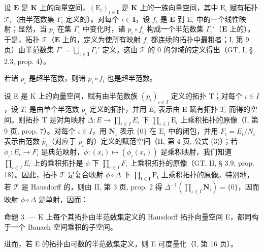 设 \(\mathbf{E}\) 是 \(\mathbf{K}\) 上的向量空间，\((\mathrm{E}_{\iota})_{\iota \in \mathbf{I}}\) 是 \(\mathbf{K}\) 上的一族向量空间，其中 \(\mathrm{E}_{\iota}\) 赋有拓扑 \(\mathcal{T}_{\iota}\)（由半范数集 \(\Gamma_{\iota}\) 定义的）。对每个 \(\iota \in \mathbf{I}\)，设 \(f_{\iota}\) 是 \(\mathbf{E}\) 到 \(\mathrm{E}_{\iota}\) 中的一个线性映射；显然，当 \(p_{\iota}\) 在集 \(\Gamma_{\iota}\) 中变化时，诸 \(p_{\iota} \circ f_{\iota}\) 构成一个半范数集 \(\Gamma_{\iota}'\)（\(\mathbf{E}\) 上的）。于是，拓扑 \(\mathcal{T}\)（\(\mathbf{E}\) 上的，定义为使所有映射 \(f_{\iota}\) 都连续的拓扑中最粗者；I, 第 9 页）由半范数集 \(\Gamma' = \bigcup_{\iota \in \mathbf{I}} \Gamma_{\iota}'\) 定义，这由 \(\mathcal{T}\) 的 0 的邻域的定义得出（GT, I, § 2.3, prop. 4）。

若诸 \(p_{\iota}\) 是超半范数，则诸 \(p_{\iota} \circ f_{\iota}\) 也是超半范数。

设 E 是 K 上的向量空间，赋有由半范数族 \((p_{\iota})_{\iota \in I}\) 定义的拓扑 T；对每个 \(\iota \in I\)，设 \(T_{\iota}\) 是由单个半范数 \(p_{\iota}\) 定义的拓扑，并用 \(E_{\iota}\) 表示由 E 赋有拓扑 \(T_{\iota}\) 而得的空间。则拓扑 T 是对角映射 \(\Delta : E \to \prod_{\iota \in I} E_{\iota}\) 下 \(\prod_{\iota \in I} \mathrm{E}_{\iota}\) 上乘积拓扑的原像（I, 第 9 页, prop. 7）。对每个 \(\iota \in I\)，用 \(\mathbf {N} _ {\iota}\) 表示 \(\{0 \}\) 在 \(\mathrm{E} _ {\iota}\) 中的闭包，并用 \(F_{\iota} = E_{\iota}/N_{\iota}\) 表示由范数 \(\hat{p}_{\iota}\)（对应于 \(p_{\iota}\) 的）定义的赋范空间（II, 第 4 页, 公式 (3)）；若 \(\phi_{\iota}: E_{\iota} \to F_{\iota}\) 是典范映射，\(\phi : (x_{\iota}) \mapsto (\phi_{\iota}(x_{\iota}))\) 是乘积映射，我们知道 \(\prod_{i \in I} E_{i}\) 上的乘积拓扑是 \(\phi\) 下 \(\prod_{\iota \in I}F_{\iota}\) 上乘积拓扑的原像（GT, II, § 3.9, prop. 18）。因此，拓扑 \(\mathcal{T}\) 是复合映射 \(\phi \circ \Delta\) 下 \(\prod_{\mathfrak{t}\in \mathbf{I}}\mathrm{F}_{\mathfrak{t}}\) 上乘积拓扑的原像。特别地，若 \(\mathcal{T}\) 是 Hausdorff 的，则由 II, 第 3 页, prop. 2 得 \(\Delta^{-1}(\prod_{\iota \in I} \mathbf{N}_{\iota}) = \{0 \}\)，因而映射 \(\phi \circ \Delta\) 是单射，因而：

命题 3. --- K 上每个其拓扑由半范数集定义的 Hausdorff 拓扑向量空间 E，都同构于一个 Banach 空间乘积的子空间。

进而，若 E 的拓扑由可数的半范数集定义，则 E 可度量化（I, 第 16 页）。

